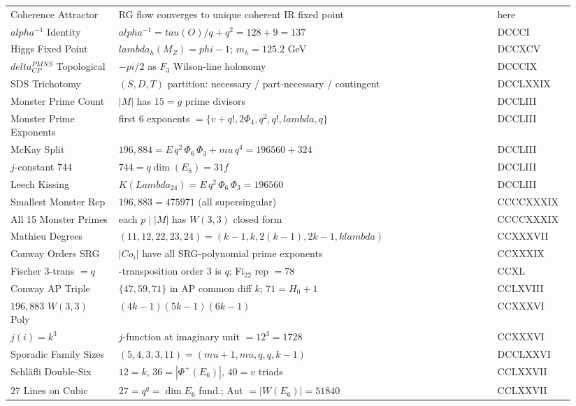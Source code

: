 \documentclass[11pt]{article}
\def\mathbb#1{#1}%
\def\mathrm#1{#1}%
\def\mathbf#1{#1}%
\def\text#1{#1}%
\def\alpha{alpha}%
\def\delta{delta}%
\def\lambda{lambda}%
\def\Lambda{Lambda}%
\def\mu{mu}%
\def\phi{phi}%
\def\Phi#1{Phi#1}%
\def\pi{pi}%
\def\tau{tau}%
\def\cdot{ }%
\begin{document}
{\begin{longtable}{>{\raggedright\arraybackslash}p{0.18\linewidth} >{\raggedright\arraybackslash}p{0.63\linewidth} >{\raggedright\arraybackslash}p{0.13\linewidth}}
Coherence Attractor & RG flow converges to unique coherent IR fixed point & here \\
$\alpha^{-1}$ Identity & $\alpha^{-1} = \tau(O)/q + q^2 = 128 + 9 = 137$ & DCCCI \\
Higgs Fixed Point & $\lambda_h(M_Z) = \phi - 1$; $m_h = 125.2$ GeV & DCCXCV \\
$\delta_{CP}^{\text{PMNS}}$ Topological & $-\pi/2$ as $\mathbb{F}_3$ Wilson-line holonomy & DCCCIX \\
SDS Trichotomy & $(S, D, T)$ partition: necessary / part-necessary / contingent & DCCLXXIX \\
Monster Prime Count & $|\mathbb{M}|$ has $15 = g$ prime divisors & DCCLIII \\
Monster Prime Exponents & first 6 exponents $= \{v{+}q!, 2\Phi_4, q^2, q!, \lambda, q\}$ & DCCLIII \\
McKay Split & $196{,}884 = E\,q^2\,\Phi_6\,\Phi_3 + \mu\,q^4 = 196560 + 324$ & DCCLIII \\
$j$-constant $744$ & $744 = q\cdot \dim(E_8) = 31 \cdot f$ & DCCLIII \\
Leech Kissing & $K(\Lambda_{24}) = E\,q^2\,\Phi_6\,\Phi_3 = 196560$ & DCCLIII \\
Smallest Monster Rep & $196{,}883 = 47\cdot 59\cdot 71$ (all supersingular) & CCCCXXXIX \\
All 15 Monster Primes & each $p \mid |\mathbb{M}|$ has $W(3,3)$ closed form & CCCCXXXIX \\
Mathieu Degrees & $(11, 12, 22, 23, 24) = (k{-}1, k, 2(k{-}1), 2k{-}1, k\lambda)$ & CCXXXVII \\
Conway Orders SRG & $|\mathrm{Co}_i|$ have all SRG-polynomial prime exponents & CCXXXIX \\
Fischer 3-trans $=q$ & 3-transposition order $\mathbf{3}$ is $q$; Fi$_{22}$ rep $= 78$ & CCXL \\
Conway AP Triple & $\{47, 59, 71\}$ in AP common diff $k$; $71 = H_0{+}1$ & CCLXVIII \\
$196{,}883$ $W(3,3)$ Poly & $(4k{-}1)(5k{-}1)(6k{-}1)$ & CCXXXVI \\
$j(i) = k^3$ & $j$-function at imaginary unit $= 12^3 = 1728$ & CCXXXVI \\
Sporadic Family Sizes & $(5, 4, 3, 3, 11) = (\mu{+}1, \mu, q, q, k{-}1)$ & DCCLXXVI \\
Schläfli Double-Six & $12 = k$, $36 = |\Phi^+(E_6)|$, $40 = v$ triads & CCLXXVII \\
$27$ Lines on Cubic & $27 = q^q = \dim E_6$ fund.; Aut $= |W(E_6)| = 51840$ & CCLXXVII \\

\end{longtable}}
\end{document}
